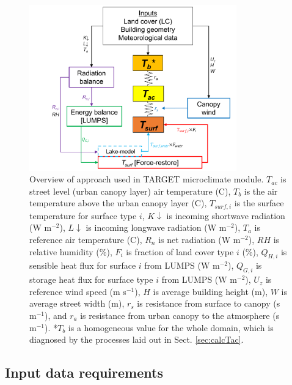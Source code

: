 \documentclass[gmd, manuscript]{copernicus}
\begin{document}
\begin{figure}[!htbp]
\begin{center}

\includegraphics[width=0.8\textwidth,keepaspectratio]{figure1.png}

\caption{Overview of approach used in TARGET microclimate module. $T_{ac}$ is street level (urban canopy layer) air temperature (\degree C), \ensuremath{T_{b}} is the air temperature above the urban canopy layer (\degree C), $T_{surf,i}$ is the surface temperature for surface type $i$, \ensuremath{K\downarrow} is incoming shortwave radiation (W m$^{-2}$), \ensuremath{L\downarrow} is incoming longwave radiation (W m$^{-2}$), \ensuremath{T_{a}} is reference air temperature (\degree C), \ensuremath{R_{n}} is net radiation (W m$^{-2}$), \ensuremath{RH} is relative humidity (\%), $F_{i}$ is fraction of land cover type $i$ (\%), \ensuremath{Q_{H,i}} is sensible heat flux for surface $i$ from LUMPS (W m$^{-2}$), \ensuremath{Q_{G,i}} is storage heat flux for surface type $i$ from LUMPS (W m$^{-2}$), \ensuremath{U_{z}} is reference wind speed (m s$^{-1}$), $H$ is average building height (m), $W$ is average street width (m), \ensuremath{r_{s}} is resistance from surface to canopy (s m$^{-1}$), and \ensuremath{r_{a}} is resistance from urban canopy to the atmosphere (s m$^{-1}$). *\ensuremath{T_{b}} is a homogeneous value for the whole domain, which is diagnosed by the processes laid out in Sect. \ref{sec:calcTac}.} \label{fig:overview}
 \end{center}

\end{figure}


\subsection{Input data requirements}\label{sec:datainputs}
\end{document}
